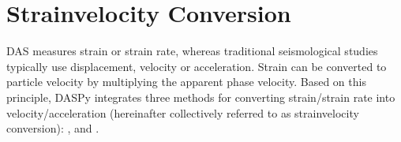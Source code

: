 \documentclass[letterpaper,10pt,english]{sphinxmanual}
\begin{document}
\section{Strain\sphinxhyphen{}velocity Conversion}
\label{\detokenize{Strain-velocity Conversion:strain-velocity-conversion}}\label{\detokenize{Strain-velocity Conversion::doc}}
\sphinxAtStartPar
DAS measures strain or strain rate, whereas traditional seismological studies typically use displacement, velocity or acceleration. Strain can be converted to particle velocity by multiplying the apparent phase velocity. Based on this principle, DASPy integrates three methods for converting strain/strain rate into velocity/acceleration (hereinafter collectively referred to as strain\sphinxhyphen{}velocity conversion): {\hyperref[\detokenize{Strain-velocity Conversion:fk-rescaling-method}]{}}, {\hyperref[\detokenize{Strain-velocity Conversion:curvelet-transform-method}]{}} and {\hyperref[\detokenize{Strain-velocity Conversion:time-domain-slowness-detection-method}]{}}.
\end{document}
